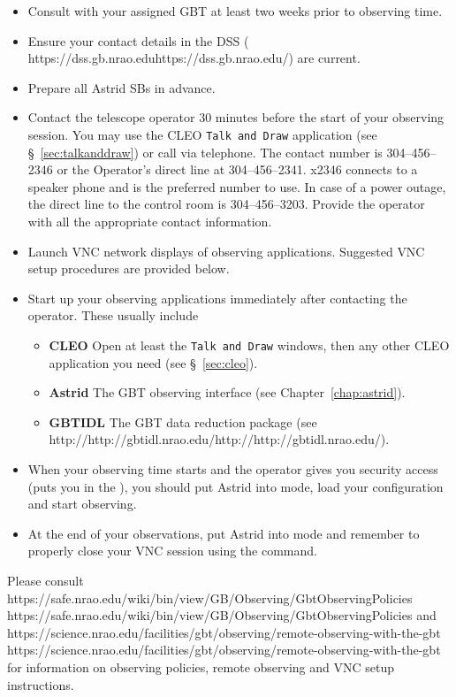 \begin{itemize}[leftmargin=*]

\item Consult with your assigned \gls{GBT}  at least two weeks prior to
observing time.
\item Ensure your contact details in the \gls{DSS} (\htmladdnormallink
{https://dss.gb.nrao.edu}{https://dss.gb.nrao.edu/}) are current.
\item Prepare all \gls{Astrid} \glspl{SB} in advance.
\item Contact the telescope operator 30 minutes before the start of your observing
session.  You may use the \gls{CLEO} {\tt Talk and Draw} application (see
\S~\ref{sec:talkanddraw}) or call via telephone.  The contact number is
304--456--2346 or the Operator's direct line at 304--456--2341. x2346 connects to a
speaker phone and is the preferred number to use.  In case of a power outage, the direct
line to the control room is 304--456--3203. Provide the operator with all the
appropriate contact information.
\item Launch \gls{VNC} network displays of observing applications. Suggested \gls{VNC}
setup procedures are provided below.
\item Start up your observing applications immediately after contacting the operator.
These usually include
\begin{itemize}
\item {\bf CLEO} Open at least the {\tt Talk and Draw} windows, then any other \gls{CLEO}
application you need (see \S~\ref{sec:cleo}).
\item {\bf Astrid} The \gls{GBT} observing interface (see Chapter~\ref{chap:astrid}).
\item {\bf GBTIDL} The \gls{GBT} data reduction package (see \htmladdnormallink
{http://http://gbtidl.nrao.edu/}{http://http://gbtidl.nrao.edu/}).
\end{itemize}
\item When your observing time starts and the operator gives you security access
(puts you in the ), you should put \gls{Astrid} into  mode,
load your configuration and start observing.
\item At the end of your observations, put \gls{Astrid} into  mode and
remember to properly close your \gls{VNC} session using the 
command.
\end{itemize}


Please consult \htmladdnormallink
{https://safe.nrao.edu/wiki/bin/view/GB/Observing/GbtObservingPolicies}
{https://safe.nrao.edu/wiki/bin/view/GB/Observing/GbtObservingPolicies} and \\
\htmladdnormallink
{https://science.nrao.edu/facilities/gbt/observing/remote-observing-with-the-gbt}
{https://science.nrao.edu/facilities/gbt/observing/remote-observing-with-the-gbt}
for information on observing policies, remote observing and \gls{VNC} setup
instructions.
